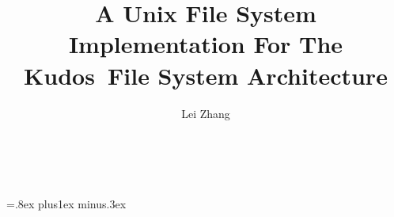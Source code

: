 \documentclass[10pt,twocolumn,letterpaper]{article}
\newcommand{\Kudos}{Kudos}
\begin{document}
\normalsize

\title{\sffamily\textbf{A Unix File System Implementation For The \Kudos\ File System Architecture}}


\author{\sffamily Lei Zhang \\
\noalign{\vskip2pt}
 \\
\noalign{\vskip2pt}
 \\
\noalign{\vskip-.25in}
\null}
\date{}
\maketitle

\def\assast{\raise.2ex\hbox{$^\ast$}}





















\begin{footnotesize}
\bibsep=.8ex plus1ex minus.3ex


\end{footnotesize}
\end{document}
